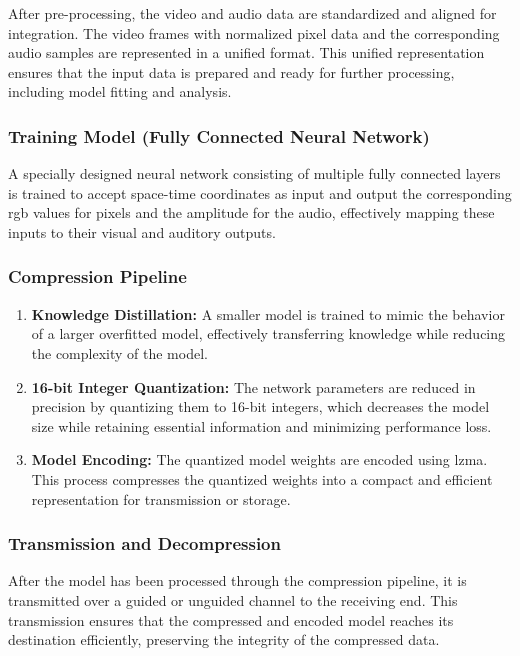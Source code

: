         After pre-processing, the video and audio data are standardized and aligned for integration. The video frames with normalized pixel data and the corresponding audio samples are represented in a unified format. This unified representation ensures that the input data is prepared and ready for further processing, including model fitting and analysis.
        
        \subsubsection{Training Model (Fully Connected Neural Network)}
        A specially designed neural network consisting of multiple fully connected layers is trained to accept space-time coordinates as input and output the corresponding \gls{rgb} values for pixels and the amplitude for the audio, effectively mapping these inputs to their visual and auditory outputs.
    
        \subsubsection{Compression Pipeline}
        \begin{enumerate}[label=\textbf{\roman*.}]
            \item \textbf{Knowledge Distillation:} A smaller model is trained to mimic the behavior of a larger overfitted model, effectively transferring knowledge while reducing the complexity of the model.
            \item \textbf{16-bit Integer Quantization:} The network parameters are reduced in precision by quantizing them to 16-bit integers, which decreases the model size while retaining essential information and minimizing performance loss.
            \item \textbf{Model Encoding:} The quantized model weights are encoded using \gls{lzma}. This process compresses the quantized weights into a compact and efficient representation for transmission or storage.
        \end{enumerate}
        \subsubsection{Transmission and Decompression}

        After the model has been processed through the compression pipeline, it is transmitted over a guided or unguided channel to the receiving end. This transmission ensures that the compressed and encoded model reaches its destination efficiently, preserving the integrity of the compressed data.

